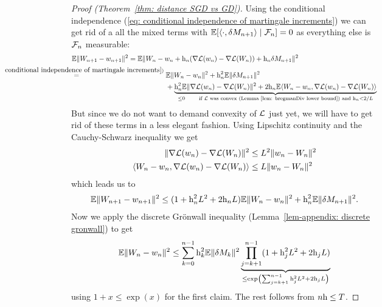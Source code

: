 \begin{proof}[Proof (Theorem~\ref{thm: distance SGD vs GD})]
	Using the conditional independence (\ref{eq: conditional independence of martingale increments})
	we can get rid of a all the mixed terms with
	\(\mathbb{E}[\langle \cdot, \delta M_{n+1}\rangle\mid\mathcal{F}_n]=0\) as everything
	else is \(\mathcal{F}_n\) measurable:
	\begin{align*}
		&\E\|\Weights_{n+1}-\weights_{n+1}\|^2
		= \E\|\Weights_n - \weights_n
		+ \lr_n(\nabla\Loss(\weights_n)-\nabla\Loss(\Weights_n))
		+ \lr_n\martIncr_{n+1}\|^2\\
		&\lxeq{(\ref{eq: conditional independence of martingale increments})}
		\begin{aligned}[t]
			&\E\|\Weights_n-\weights_n\|^2 + \lr_n^2\E\|\martIncr_{n+1}\|^2\\
			&+\underbrace{
				\lr_n^2\E\|\nabla\Loss(\weights_n)-\nabla\Loss(\Weights_n)\|^2
				+ 2\lr_n\E\langle\Weights_n-\weights_n,
				\nabla\Loss(\weights_n)-\nabla\Loss(\Weights_n)\rangle
			}_{
				\le 0 \qquad
				\text{if \(\Loss\) was convex (Lemma~\ref{lem: bregmanDiv lower bound}) and }
				\lr_n<2/\ubound
			}
		\end{aligned}
	\end{align*}
	But since we do not want to demand convexity of \(\mathcal{L}\) just yet, we will
	have to get rid of these terms in a less elegant fashion. Using Lipschitz
	continuity and the Cauchy-Schwarz inequality we get
	\begin{align*}
		\|\nabla\mathcal{L}(w_n)-\nabla\mathcal{L}(W_n)\|^2
		&\le L^2\|w_n-W_n\|^2\\
		\langle W_n-w_n,
		\nabla\mathcal{L}(w_n)-\nabla\mathcal{L}(W_n)\rangle
		&\le L \|w_n-W_n\|^2
	\end{align*}
	which leads us to
	\begin{align*}
		\mathbb{E}\|W_{n+1}-w_{n+1}\|^2
		\le (1+\text{h}_n^2L^2 + 2\text{h}_nL)\mathbb{E}\|W_n-w_n\|^2
		+ \text{h}_n^2\mathbb{E}\|\delta M_{n+1}\|^2.
	\end{align*}
	Now we apply the discrete Gr\"onwall inequality (Lemma~\ref{lem-appendix:
	discrete gronwall}) to get
	\begin{align*}
		\mathbb{E}\|W_n-w_n\|^2
		\le \sum_{k=0}^{n-1}\text{h}_k^2\mathbb{E}\|\delta M_k\|^2
		\underbrace{
			\prod_{j=k+1}^{n-1}(1+\text{h}_j^2L^2 + 2\text{h}_jL)
		}_{
			\le \exp\left(\sum_{j=k+1}^{n-1}\text{h}_j^2L^2 + 2\text{h}_jL\right)
		}
	\end{align*}
	using \(1+x\le\exp(x)\) for the first claim. The rest 
	follows from \(n\text{h}\le T\).
\end{proof}

